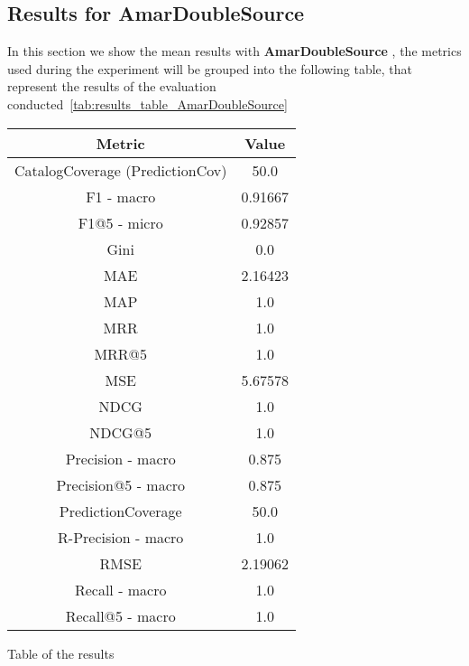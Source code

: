 \documentclass[11pt]{article}
\begin{document}
\hfill\break
\hfill\break



\subsection{Results for AmarDoubleSource}\label{subsec:AmarDoubleSource}
In this section we show the mean results with \textbf{ AmarDoubleSource }, the metrics used during the experiment will be
grouped into the following table, that represent the results of the evaluation conducted~\ref{tab:results_table_AmarDoubleSource}

\begin{center}
    \begin{tabular}{|c|c|}
        \hline
        \textbf{Metric} & \textbf{Value} \\ \hline
                CatalogCoverage (PredictionCov) & 50.0 \\ \hline
                F1 - macro & 0.91667 \\ \hline
                F1@5 - micro & 0.92857 \\ \hline
                Gini & 0.0 \\ \hline
                MAE & 2.16423 \\ \hline
                MAP & 1.0 \\ \hline
                MRR & 1.0 \\ \hline
                MRR@5 & 1.0 \\ \hline
                MSE & 5.67578 \\ \hline
                NDCG & 1.0 \\ \hline
                NDCG@5 & 1.0 \\ \hline
                Precision - macro & 0.875 \\ \hline
                Precision@5 - macro & 0.875 \\ \hline
                PredictionCoverage & 50.0 \\ \hline
                R-Precision - macro & 1.0 \\ \hline
                RMSE & 2.19062 \\ \hline
                Recall - macro & 1.0 \\ \hline
                Recall@5 - macro & 1.0 \\ \hline
             \end{tabular}
    \captionsetup{type=table}
    \caption{Table of the results}
    \label{tab:results_table_AmarDoubleSource}
\end{center}
\hfill\break
\hfill\break
\end{document}
